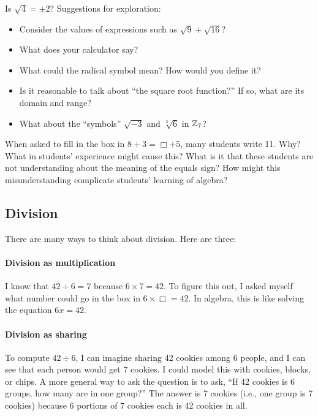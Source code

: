 \documentclass[space,nooutcomes]{ximera}
\begin{document}
\begin{problem}
Is $\sqrt{4}=\pm 2$?  Suggestions for exploration:  
\begin{itemize} 
\item Consider the values of expressions such as $\sqrt{9}+\sqrt{16}$?  
\item What does your calculator say?  
\item What could the radical symbol mean?  How would you define it?  
\item Is it reasonable to talk about ``the square root function?''  If so, what are its domain and range? 
\item What about the ``symbols'' $\sqrt{-3}$ and $\sqrt[3]{6}$ in $\mathbb Z_7$?  
\end{itemize}
\end{problem}

\begin{problem}
When asked to fill in the box in  $8 + 3 = \Box + 5$, many students write 11.  Why?  What in students' experience might cause this?  What is it that these students are not understanding about the meaning of the equals sign?  How might this misunderstanding complicate students' learning of algebra?  
\end{problem}

\subsection*{Division}
There are many ways to think about division.  Here are three:

\paragraph{Division as multiplication}  I know that $42\div 6=7$ because $6\times 7=42$.  To figure this out, I asked myself what number could go in the box in $6\times \Box =42$.  In algebra, this is like solving the equation $6x=42$.

\paragraph{Division as sharing}  To compute $42\div 6$, I can imagine sharing 42 cookies among 6 people, and I can see that each person would get 7 cookies.  I could model this with cookies, blocks, or chips.  A more general way to ask the question is to ask, ``If 42 cookies is 6 groups, how many are in one group?''  The answer is 7 cookies (i.e., one group is 7 cookies) because 6 portions of 7 cookies each is 42 cookies in all.  
\end{document}

